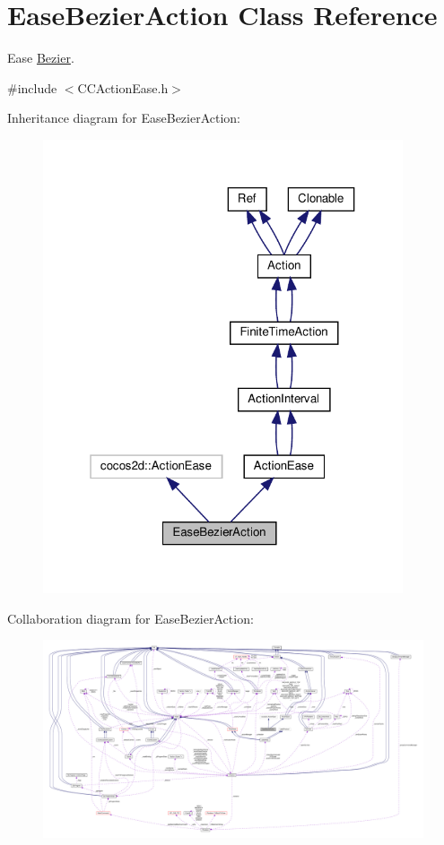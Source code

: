 \hypertarget{classEaseBezierAction}{}\section{Ease\+Bezier\+Action Class Reference}
\label{classEaseBezierAction}


Ease \hyperlink{structBezier}{Bezier}.  




{\ttfamily \#include $<$C\+C\+Action\+Ease.\+h$>$}



Inheritance diagram for Ease\+Bezier\+Action\+:
\nopagebreak
\begin{figure}[H]
\begin{center}
\leavevmode
\includegraphics[width=301pt]{classEaseBezierAction__inherit__graph}
\end{center}
\end{figure}


Collaboration diagram for Ease\+Bezier\+Action\+:
\nopagebreak
\begin{figure}[H]
\begin{center}
\leavevmode
\includegraphics[width=350pt]{classEaseBezierAction__coll__graph}
\end{center}
\end{figure}
